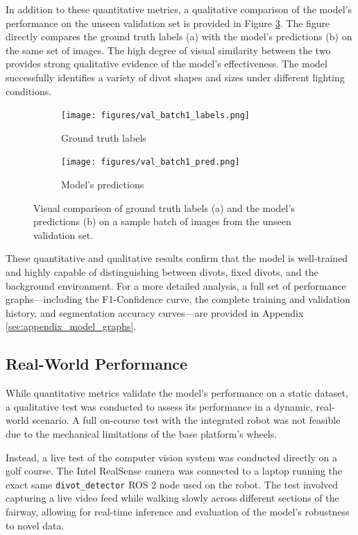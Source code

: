 In addition to these quantitative metrics, a qualitative comparison of the model's performance on the unseen validation set is provided in Figure \ref{fig:validation_comparison}. The figure directly compares the ground truth labels (a) with the model's predictions (b) on the same set of images. The high degree of visual similarity between the two provides strong qualitative evidence of the model's effectiveness. The model successfully identifies a variety of divot shapes and sizes under different lighting conditions.

\begin{figure}[h!]
    \centering
    \begin{subfigure}[b]{0.49\textwidth}
        \centering
        \texttt{[image: figures/val\_batch1\_labels.png]}
        \caption{Ground truth labels}
        \label{fig:val_labels}
    \end{subfigure}
    \hfill 
    \begin{subfigure}[b]{0.49\textwidth}
        \centering
        \texttt{[image: figures/val\_batch1\_pred.png]}
        \caption{Model's predictions}
        \label{fig:val_preds}
    \end{subfigure}
    \caption{Visual comparison of ground truth labels (a) and the model's predictions (b) on a sample batch of images from the unseen validation set.}
    \label{fig:validation_comparison}
\end{figure}

These quantitative and qualitative results confirm that the model is well-trained and highly capable of distinguishing between divots, fixed divots, and the background environment. For a more detailed analysis, a full set of performance graphs—including the F1-Confidence curve, the complete training and validation history, and segmentation accuracy curves—are provided in Appendix \ref{sec:appendix_model_graphs}.

\subsection{Real-World Performance}
\label{ssec:cv_real_world}

While quantitative metrics validate the model's performance on a static dataset, a qualitative test was conducted to assess its performance in a dynamic, real-world scenario. A full on-course test with the integrated robot was not feasible due to the mechanical limitations of the base platform's wheels.

Instead, a live test of the computer vision system was conducted directly on a golf course. The Intel RealSense camera was connected to a laptop running the exact same \texttt{divot\_detector} ROS 2 node used on the robot. The test involved capturing a live video feed while walking slowly across different sections of the fairway, allowing for real-time inference and evaluation of the model's robustness to novel data.

